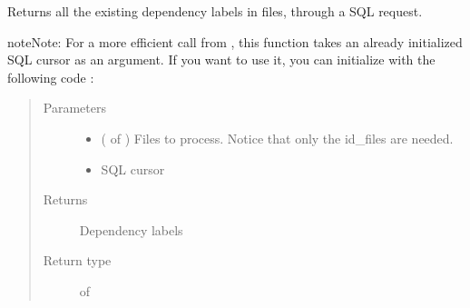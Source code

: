 \documentclass[letterpaper,10pt,english]{sphinxmanual}
\begin{document}

\begin{fulllineitems}
\label{\detokenize{analysis:loacore.analysis.frequencies.get_label_set}}
Returns all the existing dependency labels in files, through a SQL request.

\begin{sphinxadmonition}{note}{Note:}
For a more efficient call from {\hyperref[\detokenize{analysis:loacore.analysis.frequencies.label_frequencies}]{}}, this function takes an already initialized SQL
cursor as an argument.
If you want to use it, you can initialize  with the following code :

%
\begin{sphinxVerbatim}[commandchars=\\\{\}]
   
   
  
  
\end{sphinxVerbatim}
\end{sphinxadmonition}
\begin{quote}\begin{description}
\item[{Parameters}] \leavevmode\begin{itemize}
\item {} 
 ( of {\hyperref[\detokenize{classes:loacore.classes.classes.File}]{}}) \textendash{} Files to process. Notice that only the id\_files are needed.

\item {} 
 \textendash{} SQL cursor

\end{itemize}

\item[{Returns}] \leavevmode
Dependency labels

\item[{Return type}] \leavevmode
{} of 

\end{description}\end{quote}

\end{fulllineitems}
\end{document}
